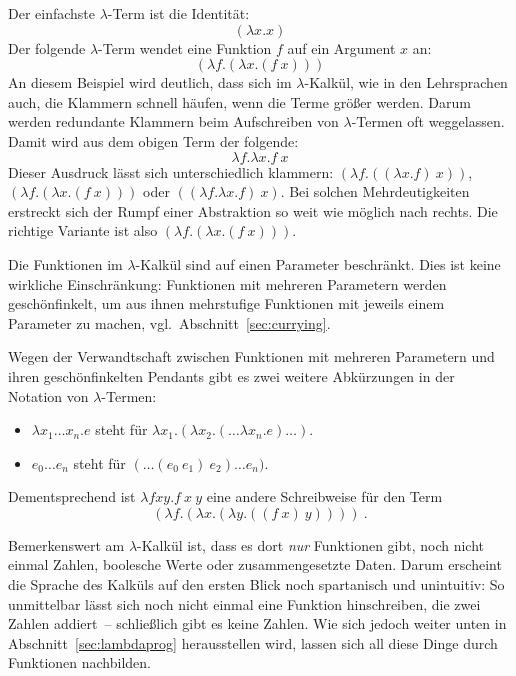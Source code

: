 Der einfachste $\lambda$-Term ist die Identität:
%
\begin{displaymath}
  (\lambda x.x)
\end{displaymath}
%
Der folgende $\lambda$-Term wendet eine Funktion $f$ auf ein Argument
$x$ an:
%
\begin{displaymath}
  (\lambda f.(\lambda x.(f~x)))
\end{displaymath}
%
An diesem Beispiel wird deutlich, dass sich im $\lambda$-Kalkül, wie
in den Lehrsprachen  auch, die Klammern schnell häufen, wenn die Terme größer
werden.  Darum werden redundante Klammern beim Aufschreiben von
$\lambda$-Termen oft weggelassen.  Damit wird aus dem obigen Term der
folgende:
%
\begin{displaymath}
  \lambda f.\lambda x.f~x
\end{displaymath}
%
Dieser Ausdruck lässt sich unterschiedlich
klammern: $(\lambda f.((\lambda x.f)~x))$, $(\lambda
f.(\lambda x.(f~x)))$ oder $((\lambda f.\lambda x.f)~x)$.  Bei
solchen Mehrdeutigkeiten 
erstreckt sich der Rumpf einer Abstraktion so weit wie möglich nach rechts.
Die richtige Variante ist also  $(\lambda
f.(\lambda x.(f~x)))$.

Die Funktionen im
$\lambda$-Kalkül sind auf einen Parameter
beschränkt.  Dies ist keine wirkliche
Einschränkung: Funktionen mit mehreren Parametern werden 
geschönfinkelt, um aus ihnen mehrstufige Funktionen mit jeweils einem
Parameter zu machen, vgl.\ Abschnitt~\ref{sec:currying}.

Wegen der Verwandtschaft zwischen Funktionen mit mehreren Parametern
und ihren geschönfinkelten Pendants gibt es zwei weitere Abkürzungen
in der Notation von $\lambda$-Termen:
%
\begin{itemize}
\item $\lambda x_1 \ldots x_n.e$ steht für $\lambda x_1.(\lambda
  x_2.(\ldots\lambda x_n.e)\ldots)$.
\item $e_0 \ldots e_n$ steht für $(\ldots(e_0~e_1)~e_2) \ldots e_n)$.
\end{itemize}
%
Dementsprechend ist $\lambda fxy.f~x~y$ eine andere Schreibweise für
den Term \[(\lambda f.(\lambda x.(\lambda y.((f~x)~y))))\ .\]

Bemerkenswert am $\lambda$-Kalkül ist, dass es dort \emph{nur}
Funktionen gibt, noch nicht einmal Zahlen, boolesche Werte oder
zusammengesetzte Daten.  Darum erscheint die Sprache des Kalküls auf den
ersten Blick noch spartanisch und unintuitiv: So unmittelbar lässt sich
noch nicht einmal eine Funktion hinschreiben, die zwei Zahlen addiert~--
schließlich gibt es keine Zahlen.  Wie sich jedoch weiter unten in
Abschnitt~\ref{sec:lambdaprog} herausstellen wird, lassen sich all diese
Dinge durch Funktionen nachbilden.

